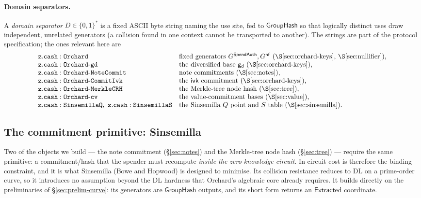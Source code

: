 \documentclass[11pt,a4paper]{article}
\theoremstyle{definition}
\newcommand{\Extract}{\ensuremath{\mathsf{Extract}}}
\newcommand{\GroupHash}{\ensuremath{\mathsf{GroupHash}}}
\newcommand{\ivk}{\ensuremath{\mathsf{ivk}}}
\newcommand{\gd}{\ensuremath{\mathsf{g_d}}}
\begin{document}
\paragraph{Domain separators.}
A \emph{domain separator} $D \in \{0,1\}^*$ is a fixed ASCII byte string
naming the use site, fed to $\GroupHash$ so that logically distinct uses
draw independent, unrelated generators (a collision found in one context
cannot be transported to another). The strings are part of the protocol
specification; the ones relevant here are
\[
\begin{array}{ll}
\mathtt{z.cash:Orchard} & \text{fixed generators } G^{\mathsf{SpendAuth}}, G^{\mathsf{nf}} \text{ (\S\ref{sec:orchard-keys}, \S\ref{sec:nullifier}),}\\
\mathtt{z.cash:Orchard\text{-}gd} & \text{the diversified base } \gd \text{ (\S\ref{sec:orchard-keys}),}\\
\mathtt{z.cash:Orchard\text{-}NoteCommit} & \text{note commitments (\S\ref{sec:notes}),}\\
\mathtt{z.cash:Orchard\text{-}CommitIvk} & \text{the } \ivk \text{ commitment (\S\ref{sec:orchard-keys}),}\\
\mathtt{z.cash:Orchard\text{-}MerkleCRH} & \text{the Merkle-tree node hash (\S\ref{sec:tree}),}\\
\mathtt{z.cash:Orchard\text{-}cv} & \text{the value-commitment bases (\S\ref{sec:value}),}\\
\mathtt{z.cash:SinsemillaQ},\ \mathtt{z.cash:SinsemillaS} & \text{the Sinsemilla } Q \text{ point and } S \text{ table (\S\ref{sec:sinsemilla}).}
\end{array}
\]


\subsection{The commitment primitive: Sinsemilla}\label{sec:sinsemilla}

Two of the objects we build --- the note commitment (\S\ref{sec:notes})
and the Merkle-tree node hash (\S\ref{sec:tree}) --- require the same
primitive: a commitment/hash that the spender must recompute \emph{inside
the zero-knowledge circuit}. In-circuit cost is therefore the binding
constraint, and it is what Sinsemilla (Bowe and Hopwood) is designed to
minimise. Its collision resistance reduces to DL on a prime-order curve,
so it introduces no assumption beyond the DL hardness that Orchard's
algebraic core already requires. It builds directly on the preliminaries of
\S\ref{sec:prelim-curve}: its generators are $\GroupHash$ outputs, and its
short form returns an $\Extract$ed coordinate.
\end{document}
